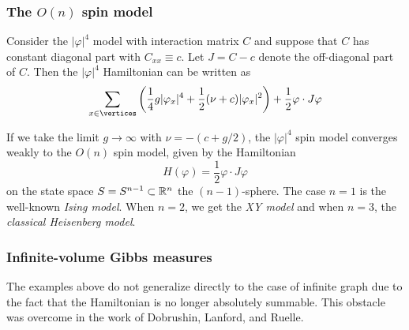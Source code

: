 \subsubsection{The $O(n)$ spin model}

Consider the $|\varphi|^4$ model with interaction matrix $C$ and suppose that $C$ has
constant diagonal part with $C_{xx} \equiv c$. Let $J = C - c$ denote the off-diagonal
part of $C$. Then the $|\varphi|^4$ Hamiltonian can be written as
\begin{equation}
\sum_{x\in\vertices}
\left(
  \frac{1}{4} g |\varphi_x|^4
    +
  \frac{1}{2} (\nu + c) |\varphi_x|^2
\right)
  +
\frac{1}{2} \varphi \cdot J \varphi
\end{equation}

If we take the limit $g\to\infty$ with $\nu = -(c + g / 2)$, the
$|\varphi|^4$ spin model converges
weakly to the $O(n)$ spin model, given by the Hamiltonian
\begin{equation}
H(\varphi) = \frac{1}{2} \varphi \cdot J \varphi
\end{equation}
on the state space $S = S^{n-1} \subset {\mathbb R}^n$ the $(n-1)$-sphere.
The case $n = 1$ is the well-known \emph{Ising model}. When $n = 2$, we get the \emph{XY model}
and when $n = 3$, the \emph{classical Heisenberg model}.


\subsubsection{Infinite-volume Gibbs measures}

The examples above do not generalize directly to the case of infinite graph due to the fact
that the Hamiltonian is no longer absolutely summable. This obstacle was overcome in the work
of Dobrushin, Lanford, and Ruelle.

